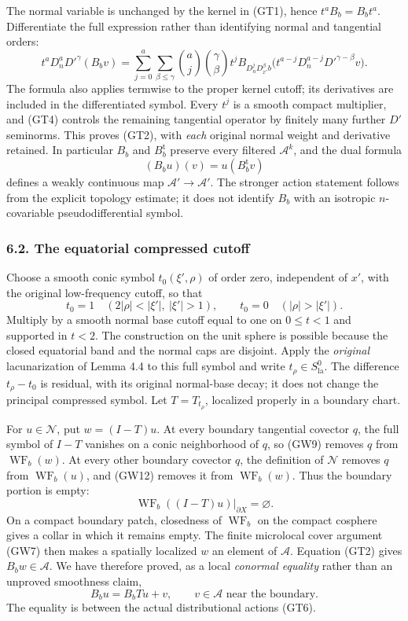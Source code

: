 \documentclass[
  11pt,
]{article}
\begin{document}
The normal variable is unchanged by the kernel in (GT1), hence
\(t^aB_b=B_bt^a\). Differentiate the full expression rather than
identifying normal and tangential orders: \[
 t^aD_n^aD'^\gamma(B_bv)
 =\sum_{j=0}^{a}\sum_{\beta\le\gamma}
       \binom aj\binom\gamma\beta
       t^j B_{D_n^jD_{x'}^\beta b}
        \bigl(t^{a-j}D_n^{a-j}D'^{\gamma-\beta}v\bigr).
 \tag{GT5}
\] The formula also applies termwise to the proper kernel cutoff; its
derivatives are included in the differentiated symbol. Every \(t^j\) is
a smooth compact multiplier, and (GT4) controls the remaining tangential
operator by finitely many further \(D'\) seminorms. This proves (GT2),
with \emph{each} original normal weight and derivative retained. In
particular \(B_b\) and \(B_b^{\mathrm t}\) preserve every filtered
\(\mathcal A^k\), and the dual formula \[
 (B_bu)(v)=u(B_b^{\mathrm t}v)
 \tag{GT6}
\] defines a weakly continuous map \(\mathcal A'\to\mathcal A'\). The
stronger action statement follows from the explicit topology estimate;
it does not identify \(B_b\) with an isotropic \(n\)-covariable
pseudodifferential symbol.

\subsubsection{6.2. The equatorial compressed
cutoff}\label{the-equatorial-compressed-cutoff}

Choose a smooth conic symbol \(t_0(\xi',\rho)\) of order zero,
independent of \(x'\), with the original low-frequency cutoff, so that
\[
 t_0=1\quad(2|\rho|<|\xi'|,\ |\xi'|>1),\qquad
 t_0=0\quad(|\rho|>|\xi'|).
 \tag{GT7}
\] Multiply by a smooth normal base cutoff equal to one on \(0\le t<1\)
and supported in \(t<2\). The construction on the unit sphere is
possible because the closed equatorial band and the normal caps are
disjoint. Apply the \emph{original} lacunarization of Lemma 4.4 to this
full symbol and write \(t_\rho\in S^0_{\mathrm{la}}\). The difference
\(t_\rho-t_0\) is residual, with its original normal-base decay; it does
not change the principal compressed symbol. Let \(T=T_{t_\rho}\),
localized properly in a boundary chart.

For \(u\in\mathcal N\), put \(w=(I-T)u\). At every boundary tangential
covector \(q\), the full symbol of \(I-T\) vanishes on a conic
neighborhood of \(q\), so (GW9) removes \(q\) from
\(\operatorname{WF}_b(w)\). At every other boundary covector \(q\), the
definition of \(\mathcal N\) removes \(q\) from
\(\operatorname{WF}_b(u)\), and (GW12) removes it from
\(\operatorname{WF}_b(w)\). Thus the boundary portion is empty: \[
 \operatorname{WF}_b((I-T)u)|_{\partial X}=\varnothing.
 \tag{GT8}
\] On a compact boundary patch, closedness of \(\operatorname{WF}_b\) on
the compact cosphere gives a collar in which it remains empty. The
finite microlocal cover argument (GW7) then makes a spatially localized
\(w\) an element of \(\mathcal A\). Equation (GT2) gives
\(B_bw\in\mathcal A\). We have therefore proved, as a local
\emph{conormal equality} rather than an unproved smoothness claim, \[
 B_bu=B_bTu+v,
 \qquad v\in\mathcal A\text{ near the boundary}.
 \tag{GT9}
\] The equality is between the actual distributional actions (GT6).
\end{document}
